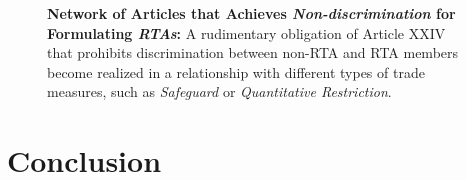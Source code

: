 \documentclass[12pt,letterpaper]{article}
\begin{document}
\begin{figure}[ht]
  \centering{
    
  }
  \caption{{\bf Network of Articles that Achieves \textit{Non-discrimination} for Formulating \textit{RTAs}:}
    A rudimentary obligation of Article XXIV that prohibits discrimination between non-RTA and RTA members become realized in a relationship with
    different types of trade measures, such as \textit{Safeguard} or \textit{Quantitative Restriction}.
  }
  \label{fig:rta-explained}
\end{figure}



\section{Conclusion}


\clearpage

\clearpage 
\end{document}
